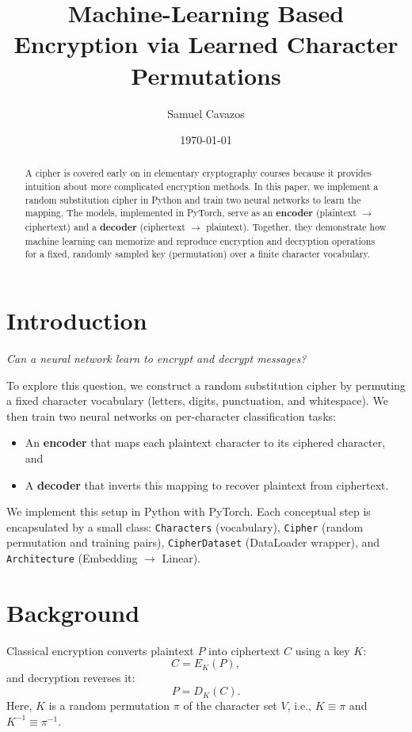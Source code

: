 \documentclass[12pt]{article}
\title{Machine-Learning Based Encryption via Learned Character Permutations}
\author{Samuel Cavazos}
\date{\today}
\begin{document}
\maketitle

\begin{abstract}
A cipher is covered early on in elementary cryptography courses because it provides intuition about more complicated encryption methods. 
In this paper, we implement a random substitution cipher in Python and train two neural networks to learn the mapping. 
The models, implemented in PyTorch, serve as an \textbf{encoder} (plaintext $\rightarrow$ ciphertext) and a \textbf{decoder} (ciphertext $\rightarrow$ plaintext). 
Together, they demonstrate how machine learning can memorize and reproduce encryption and decryption operations for a fixed, randomly sampled key (permutation) over a finite character vocabulary.
\end{abstract}

\section{Introduction}
\textit{Can a neural network learn to encrypt and decrypt messages?}

To explore this question, we construct a random substitution cipher by permuting a fixed character vocabulary (letters, digits, punctuation, and whitespace). 
We then train two neural networks on per-character classification tasks:
\begin{itemize}
    \item An \textbf{encoder} that maps each plaintext character to its ciphered character, and
    \item A \textbf{decoder} that inverts this mapping to recover plaintext from ciphertext.
\end{itemize}

We implement this setup in Python with PyTorch. Each conceptual step is encapsulated by a small class:
\texttt{Characters} (vocabulary), \texttt{Cipher} (random permutation and training pairs), 
\texttt{CipherDataset} (DataLoader wrapper), and \texttt{Architecture} (Embedding $\rightarrow$ Linear).

\section{Background}
Classical encryption converts plaintext $P$ into ciphertext $C$ using a key $K$:
\begin{equation}
C = E_K(P),
\end{equation}
and decryption reverses it:
\begin{equation}
P = D_K(C).
\end{equation}
Here, $K$ is a random permutation $\pi$ of the character set $V$, i.e., $K\equiv\pi$ and $K^{-1}\equiv\pi^{-1}$.
\end{document}
